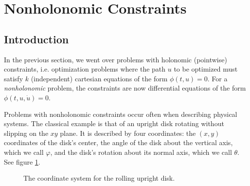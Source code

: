 \documentclass{article}
\theoremstyle{plain}
\theoremstyle{plain}
\theoremstyle{nonumberplain}
\theoremstyle{empty}
\begin{document}
\section{Nonholonomic Constraints}\label{sec:nonholonomic}

\subsection{Introduction}

In the previous section, we went over problems with holonomic (pointwise) constraints, i.e. optimization problems where the path $u$ to be optimized must satisfy $k$ (independent) cartesian equations of the form $\phi(t,u) = 0$. For a \emph{nonholonomic} problem, the constraints are now differential equations of the form $\phi(t,u,\dot u) = 0$.

Problems with nonholonomic constraints occur often when describing physical systems. The classical example is that of an upright disk rotating without slipping on the $xy$ plane. It is described by four coordinates: the $(x,y)$ coordinates of the disk's center, the angle of the disk about the vertical axis, which we call $\varphi$, and the disk's rotation about its normal axis, which we call $\theta$. See figure \ref{diskfigure}.

\begin{figure}
\centering
{}
\label{diskfigure}
\caption{The coordinate system for the rolling upright disk.}
\end{figure}
\end{document}
